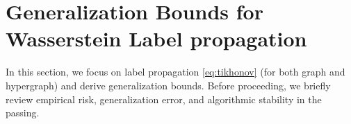 \documentclass[letterpaper]{article} %
\begin{document}
\section{Generalization Bounds for Wasserstein Label propagation}
In this section, we focus on label propagation \eqref{eq:tikhonov} (for both graph and hypergraph) and derive generalization bounds. Before proceeding, we briefly review empirical risk, generalization error, and algorithmic stability in the passing.

\end{document}
